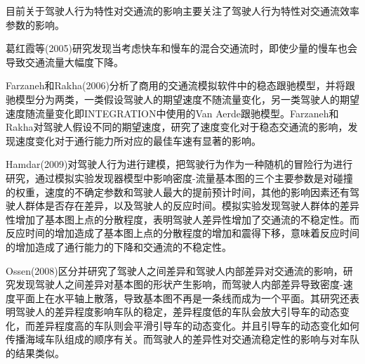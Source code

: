 目前关于驾驶人行为特性对交通流的影响主要关注了驾驶人行为特性对交通流效率参数的影响。

葛红霞等(2005)研究发现当考虑快车和慢车的混合交通流时，即使少量的慢车也会导致交通流量大幅度下降\cite{葛红霞2005}。

Farzaneh和Rakha(2006)分析了商用的交通流模拟软件中的稳态跟驰模型，并将跟驰模型分为两类，一类假设驾驶人的期望速度不随流量变化，另一类驾驶人的期望速度随流量变化即INTEGRATION中使用的Van Aerde跟驰模型。Farzaneh和Rakha对驾驶人假设不同的期望速度，研究了速度变化对于稳态交通流的影响，发现速度变化对于通行能力所对应的最佳车速有显著的影响\cite{Farzaneh2006}。

Hamdar(2009)对驾驶人行为进行建模，把驾驶行为作为一种随机的冒险行为进行研究，通过模拟实验发现器模型中影响密度-流量基本图的三个主要参数是对碰撞的权重，速度的不确定参数和驾驶人最大的提前预计时间，其他的影响因素还有驾驶人群体是否存在差异，以及驾驶人的反应时间。模拟实验发现驾驶人群体的差异性增加了基本图上点的分散程度，表明驾驶人差异性增加了交通流的不稳定性。而反应时间的增加造成了基本图上点的分散程度的增加和震得下移，意味着反应时间的增加造成了通行能力的下降和交通流的不稳定性\cite{Hamdar2009a}。


Ossen(2008)区分并研究了驾驶人之间差异和驾驶人内部差异对交通流的影响，研究发现驾驶人之间差异对基本图的形状产生影响，而驾驶人内部差异导致密度-速度平面上在水平轴上散落，导致基本图不再是一条线而成为一个平面。其研究还表明驾驶人的差异程度影响车队的稳定，差异程度低的车队会放大引导车的动态变化，而差异程度高的车队则会平滑引导车的动态变化。并且引导车的动态变化如何传播海域车队组成的顺序有关。而驾驶人的差异性对交通流稳定性的影响与对车队的结果类似\cite{Ossen2008}。

